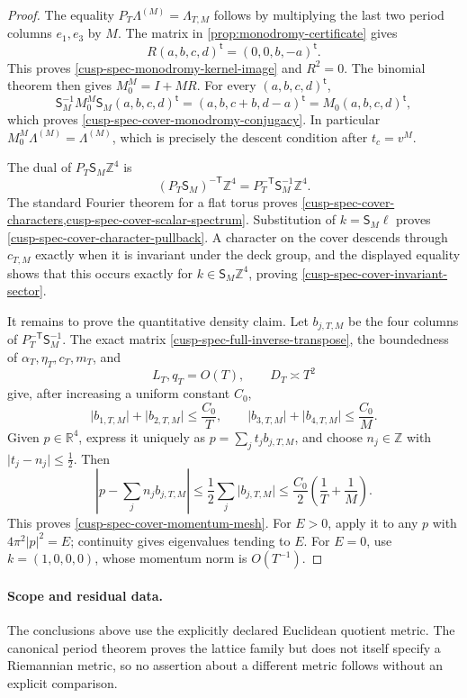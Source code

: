 \begin{proof}
The equality \(P_T\Lambda^{(M)}=\Lambda_{T,M}\) follows by multiplying the
last two period columns \(e_1,e_3\) by \(M\).  The matrix in
\cref{prop:monodromy-certificate} gives
\[
 R(a,b,c,d)^{\mathsf t}=(0,0,b,-a)^{\mathsf t}.
\]
This proves \cref{cusp-spec-monodromy-kernel-image} and \(R^2=0\).
The binomial theorem then gives \(M_0^M=I+MR\).  For every
\((a,b,c,d)^{\mathsf t}\),
\[
 \mathsf S_M^{-1}M_0^M\mathsf S_M
 (a,b,c,d)^{\mathsf t}
 =(a,b,c+b,d-a)^{\mathsf t}
 =M_0(a,b,c,d)^{\mathsf t},
\]
which proves \cref{cusp-spec-cover-monodromy-conjugacy}.  In particular
\(M_0^M\Lambda^{(M)}=\Lambda^{(M)}\), which is precisely the descent
condition after \(t_c=v^M\).

The dual of \(P_T\mathsf S_M\mathbb Z^4\) is
\[
 (P_T\mathsf S_M)^{-\mathsf T}\mathbb Z^4
 =P_T^{-\mathsf T}\mathsf S_M^{-1}\mathbb Z^4.
\]
The standard Fourier theorem for a flat torus proves
\cref{cusp-spec-cover-characters,cusp-spec-cover-scalar-spectrum}.
Substitution of \(k=\mathsf S_M\ell\) proves
\cref{cusp-spec-cover-character-pullback}.  A character on the cover
descends through \(c_{T,M}\) exactly when it is invariant under the deck
group, and the displayed equality shows that this occurs exactly for
\(k\in\mathsf S_M\mathbb Z^4\), proving
\cref{cusp-spec-cover-invariant-sector}.

It remains to prove the quantitative density claim.  Let
\(b_{j,T,M}\) be the four columns of
\(P_T^{-\mathsf T}\mathsf S_M^{-1}\).  The exact matrix
\cref{cusp-spec-full-inverse-transpose}, the boundedness of
\(\alpha_T,\eta_T,c_T,m_T\), and
\[
 L_T,q_T=O(T),\qquad D_T\asymp T^2
\]
give, after increasing a uniform constant \(C_0\),
\[
 \lvert b_{1,T,M}\rvert+\lvert b_{2,T,M}\rvert
 \le\frac{C_0}{T},
 \qquad
 \lvert b_{3,T,M}\rvert+\lvert b_{4,T,M}\rvert
 \le\frac{C_0}{M}.
\]
Given \(p\in\mathbb R^4\), express it uniquely as
\(p=\sum_jt_jb_{j,T,M}\), and choose \(n_j\in\mathbb Z\) with
\(\lvert t_j-n_j\rvert\le\tfrac12\).  Then
\[
 \left\lvert p-\sum_jn_jb_{j,T,M}\right\rvert
 \le\frac12\sum_j\lvert b_{j,T,M}\rvert
 \le\frac{C_0}{2}\left(\frac1T+\frac1M\right).
\]
This proves \cref{cusp-spec-cover-momentum-mesh}.  For \(E>0\), apply it
to any \(p\) with \(4\pi^2|p|^2=E\); continuity gives eigenvalues tending
to \(E\).  For \(E=0\), use \(k=(1,0,0,0)\), whose momentum norm is
\(O(T^{-1})\).
\end{proof}

\paragraph{Scope and residual data.}
The conclusions above use the explicitly declared Euclidean quotient metric.
The canonical period theorem proves the lattice
family but does not itself specify a Riemannian metric, so no assertion about
a different metric follows without an explicit comparison.

